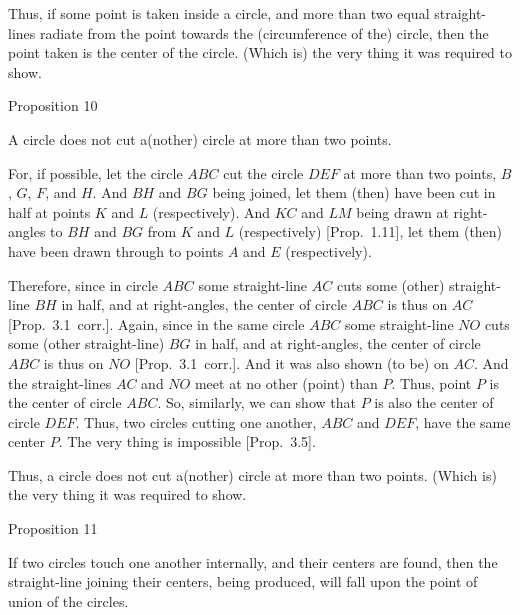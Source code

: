 Thus, if some point is taken inside a circle, and more than two equal straight-lines
radiate from the point towards the (circumference of the) circle, then the
point taken  is the center of the circle. (Which is) the very thing it was
required to show.


\begin{center}
{\large Proposition 10}
\end{center}

A circle does not cut a(nother) circle at more than two points.

For, if possible, let the circle $ABC$ cut the circle $DEF$ at more than
two points, $B$, $G$, $F$, and $H$. And $BH$ and $BG$ being joined,
let them (then) have been cut in half at points $K$ and $L$ (respectively). And $KC$ and $LM$
being drawn at right-angles to $BH$ and $BG$ from $K$ and $L$ (respectively) [Prop.~1.11], let them (then) have been
drawn through to points $A$ and $E$ (respectively).

\epsfysize=2.2in
\centerline{}

Therefore, since in circle $ABC$ some straight-line $AC$ cuts some (other)
straight-line $BH$ in half, and at right-angles, the center of circle $ABC$
is thus on $AC$ [Prop.~3.1~corr.]. Again, since in the same circle $ABC$
some straight-line $NO$ cuts some (other straight-line) $BG$ in half, and
at right-angles, the center of circle $ABC$ is thus on $NO$ [Prop.~3.1~corr.].
And it was also shown (to be) on $AC$. And the straight-lines $AC$ and $NO$
meet at no other (point) than $P$. Thus, point $P$ is the center of circle $ABC$.
So, similarly, we can show that $P$ is also the center of circle $DEF$.
Thus,  two circles cutting one another, $ABC$ and $DEF$, have the same center
$P$. The very thing is impossible [Prop.~3.5].

Thus, a circle does not cut a(nother) circle at more than two points. (Which is)
the very thing it was required to show.


\begin{center}
{\large Proposition 11}
\end{center}

If two circles  touch one another internally, and their
centers are found, then  the straight-line joining their
centers, being produced, will fall upon the point of union of
the circles.

